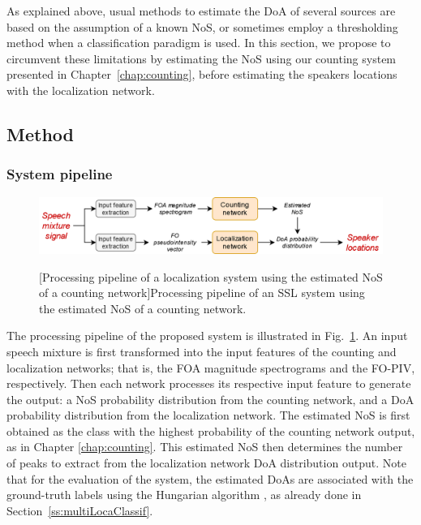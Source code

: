 As explained above, usual methods to estimate the DoA of several sources are based on the assumption of a known NoS, or sometimes employ a thresholding method when a classification paradigm is used. In this section, we propose to circumvent these limitations by estimating the NoS using our counting system presented in Chapter~\ref{chap:counting}, before estimating the speakers locations with the localization network.

\subsection{Method}
\subsubsection{System pipeline}

\begin{figure}[t]
    \begin{adjustbox}{width=1.\textwidth,center}
        \includegraphics[width=1.\linewidth]{Images/chap8/nosEstimationPipeline.png}
    \end{adjustbox}
    [Processing pipeline of a localization system using the estimated NoS of a counting network]{Processing pipeline of an SSL system using the estimated NoS of a counting network.}
    \label{fig:nosEstimationPipeline}
\end{figure}

The processing pipeline of the proposed system is illustrated in Fig.~\ref{fig:nosEstimationPipeline}. An input speech mixture is first transformed into the input features of the counting and localization networks; that is, the FOA magnitude spectrograms and the FO-PIV, respectively. Then each network processes its respective input feature to generate the output: a NoS probability distribution from the counting network, and a DoA probability distribution from the localization network. The estimated NoS is first obtained as the class with the highest probability of the counting network output, as in Chapter \ref{chap:counting}. This estimated NoS then determines the number of peaks to extract from the localization network DoA distribution output. Note that for the evaluation of the system, the estimated DoAs are associated with the ground-truth labels using the Hungarian algorithm \cite{kuhn_hungarian_1955}, as already done in Section~\ref{ss:multiLocaClassif}.

